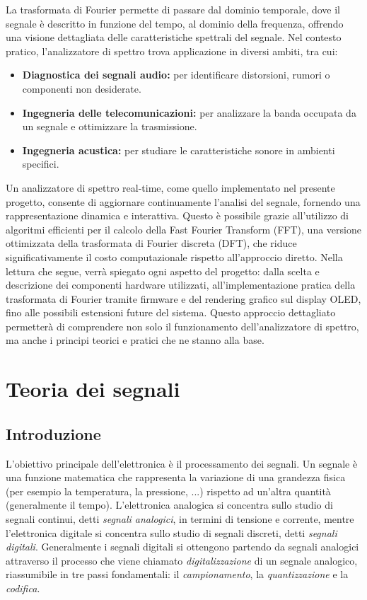 \documentclass[a4paper,12pt]{report}  %
\begin{document}
La trasformata di Fourier permette di passare dal dominio temporale, dove il segnale è descritto in funzione del tempo, al dominio della frequenza, offrendo una visione dettagliata delle caratteristiche spettrali del segnale.
Nel contesto pratico, l'analizzatore di spettro trova applicazione in diversi ambiti, tra cui:
\begin{itemize}
    \item \textbf{Diagnostica dei segnali audio:} per identificare distorsioni, rumori o componenti non desiderate.
    \item \textbf{Ingegneria delle telecomunicazioni:} per analizzare la banda occupata da un segnale e ottimizzare la trasmissione.
    \item \textbf{Ingegneria acustica:} per studiare le caratteristiche sonore in ambienti specifici.
\end{itemize}

Un analizzatore di spettro real-time, come quello implementato nel presente progetto, consente di aggiornare continuamente l'analisi del segnale, fornendo una rappresentazione dinamica e interattiva.
Questo è possibile grazie all'utilizzo di algoritmi efficienti per il calcolo della Fast Fourier Transform (FFT), una versione ottimizzata della trasformata di Fourier discreta (DFT), che riduce significativamente il costo computazionale rispetto all'approccio diretto.
Nella lettura che segue, verrà spiegato ogni aspetto del progetto: dalla scelta e descrizione dei componenti hardware utilizzati, all'implementazione pratica della trasformata di Fourier tramite firmware e del rendering grafico sul display OLED, fino alle possibili estensioni future del sistema.
Questo approccio dettagliato permetterà di comprendere non solo il funzionamento dell'analizzatore di spettro, ma anche i principi teorici e pratici che ne stanno alla base.

\section{Teoria dei segnali}

\subsection{Introduzione}
L'obiettivo principale dell'elettronica è il processamento dei segnali.
Un segnale è una funzione matematica che rappresenta la variazione di una grandezza fisica (per esempio la temperatura, la pressione, ...) rispetto ad un'altra quantità (generalmente il tempo).
L'elettronica analogica si concentra sullo studio di segnali continui, detti \textit{segnali analogici}, in termini di tensione e corrente, mentre l'elettronica digitale si concentra sullo studio di segnali discreti, detti \textit{segnali digitali}.
Generalmente i segnali digitali si ottengono partendo da segnali analogici attraverso il processo che viene chiamato \textit{digitalizzazione} di un segnale analogico, riassumibile in tre passi fondamentali: il \textit{campionamento}, la \textit{quantizzazione} e la \textit{codifica}.
\end{document}
